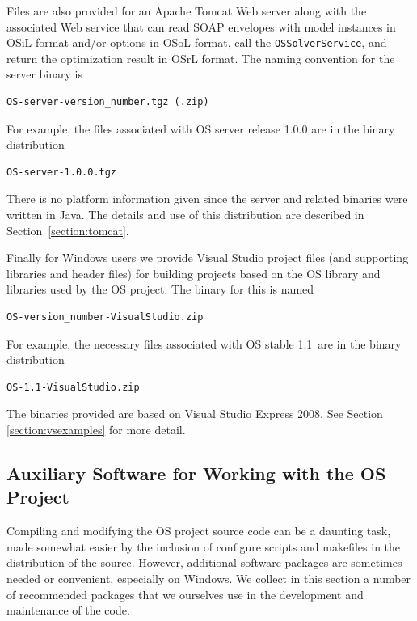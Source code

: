 \documentclass[11pt]{article}
\renewcommand{\_}{{\char"5F}}
\renewcommand{\{}{{\char"7B}}
\renewcommand{\}}{{\char"7D}}
\renewcommand{\^}{{\char"0D}}
\renewcommand{\'}{{\char"0D}}
\newcommand{\OSstable}{1.1}
\begin{document}
Files are also provided for an Apache Tomcat Web server along with the associated Web service
that can
read SOAP  envelopes with model instances in OSiL format and/or options in 
OSoL format, call the {\tt OSSolverService},
and return the optimization result in OSrL format.
The naming convention for the server binary is
\begin{verbatim}
OS-server-version_number.tgz (.zip)
\end{verbatim}
For example, the files associated with  OS server release 1.0.0 are in the binary distribution
\begin{verbatim}
OS-server-1.0.0.tgz
\end{verbatim}
There is no platform information given since the server and related binaries were written in Java.
The details and use of this distribution are described in Section~\ref{section:tomcat}.

Finally for Windows users we provide Visual Studio  project files (and supporting
libraries and header files) for building projects based on the OS library and libraries used by the OS project.
The binary for this is named
\begin{verbatim}
OS-version_number-VisualStudio.zip
\end{verbatim}
For example, the necessary files associated with  OS  stable \OSstable\ are in the binary distribution
\begin{verbatim}
OS-1.1-VisualStudio.zip
\end{verbatim}
The binaries provided are based on Visual Studio Express 2008.  See Section \ref{section:vsexamples} for more detail.

\subsection{Auxiliary Software for Working with the OS Project} \label{section:auxiliarydownloads}

Compiling and modifying the OS project source code can be a daunting task,
made somewhat easier by the inclusion of configure scripts and makefiles
in the distribution of the source. However, additional software packages are
sometimes needed or convenient, especially on Windows.
We collect in this section a number of recommended packages that we ourselves use in the development
and maintenance of the code.
\end{document}

